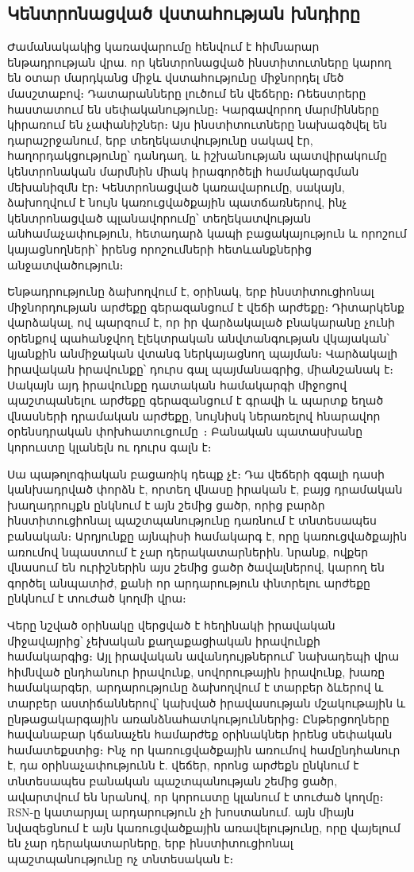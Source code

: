 \documentclass[11pt,a4paper,twocolumn]{article}
\begin{document}
\subsection{Կենտրոնացված վստահության խնդիրը}

Ժամանակակից կառավարումը հենվում է հիմնարար ենթադրության վրա. որ կենտրոնացված ինստիտուտները կարող են օտար մարդկանց միջև վստահությունը միջնորդել մեծ մասշտաբով։ Դատարանները լուծում են վեճերը։ Ռեեստրերը հաստատում են սեփականությունը։ Կարգավորող մարմինները կիրառում են չափանիշներ։ Այս ինստիտուտները նախագծվել են դարաշրջանում, երբ տեղեկատվությունը սակավ էր, հաղորդակցությունը՝ դանդաղ, և իշխանության պատվիրակումը կենտրոնական մարմնին միակ իրագործելի համակարգման մեխանիզմն էր։ Կենտրոնացված կառավարումը, սակայն, ձախողվում է նույն կառուցվածքային պատճառներով, ինչ կենտրոնացված պլանավորումը՝ տեղեկատվության անհամաչափություն, հետադարձ կապի բացակայություն և որոշում կայացնողների՝ իրենց որոշումների հետևանքներից անջատվածություն։

Ենթադրությունը ձախողվում է, օրինակ, երբ ինստիտուցիոնալ միջնորդության արժեքը գերազանցում է վեճի արժեքը։ Դիտարկենք վարձակալ, ով պարզում է, որ իր վարձակալած բնակարանը չունի օրենքով պահանջվող էլեկտրական անվտանգության վկայական՝ կյանքին անմիջական վտանգ ներկայացնող պայման։ Վարձակալի իրավական իրավունքը՝ դուրս գալ պայմանագրից, միանշանակ է։ Սակայն այդ իրավունքը դատական համակարգի միջոցով պաշտպանելու արժեքը գերազանցում է գրավի և պարտք եղած վնասների դրամական արժեքը, նույնիսկ ներառելով հնարավոր օրենսդրական փոխհատուցումը~\cite{czcourtfees}։ Բանական պատասխանը կորուստը կլանելն ու դուրս գալն է։

Սա պաթոլոգիական բացառիկ դեպք չէ։ Դա վեճերի զգալի դասի կանխադրված փորձն է, որտեղ վնասը իրական է, բայց դրամական խաղադրույքն ընկնում է այն շեմից ցածր, որից բարձր ինստիտուցիոնալ պաշտպանությունը դառնում է տնտեսապես բանական։ Արդյունքը այնպիսի համակարգ է, որը կառուցվածքային առումով նպաստում է չար դերակատարներին. նրանք, ովքեր վնասում են ուրիշներին այս շեմից ցածր ծավալներով, կարող են գործել անպատիժ, քանի որ արդարություն փնտրելու արժեքը ընկնում է տուժած կողմի վրա։

Վերը նշված օրինակը վերցված է հեղինակի իրավական միջավայրից՝ չեխական քաղաքացիական իրավունքի համակարգից։ Այլ իրավական ավանդույթներում՝ նախադեպի վրա հիմնված ընդհանուր իրավունք, սովորութային իրավունք, խառը համակարգեր, արդարությունը ձախողվում է տարբեր ձևերով և տարբեր աստիճաններով՝ կախված իրավասության մշակութային և ընթացակարգային առանձնահատկություններից։ Ընթերցողները հավանաբար կճանաչեն համարժեք օրինակներ իրենց սեփական համատեքստից։ Ինչ որ կառուցվածքային առումով համընդհանուր է, դա օրինաչափությունն է. վեճեր, որոնց արժեքն ընկնում է տնտեսապես բանական պաշտպանության շեմից ցածր, ավարտվում են նրանով, որ կորուստը կլանում է տուժած կողմը։ RSN-ը կատարյալ արդարություն չի խոստանում. այն միայն նվազեցնում է այն կառուցվածքային առավելությունը, որը վայելում են չար դերակատարները, երբ ինստիտուցիոնալ պաշտպանությունը ոչ տնտեսական է։
\end{document}
